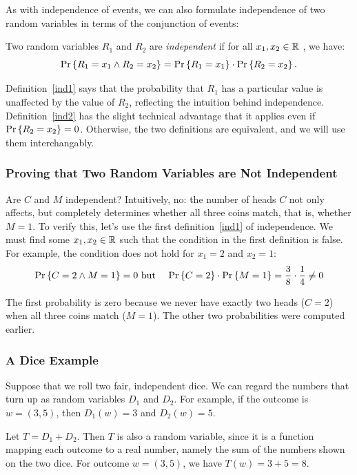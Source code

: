 \documentclass[11pt,twoside]{article}
\begin{document}
As with independence of events, we can also formulate independence of two
random variables in terms of the conjunction of events:
\begin{definition}\label{ind2}
Two random variables $R_1$ and $R_2$ are \emph{independent} if for all
$x_1, x_2 \in \mathbb{R}$ , we have:
\[
\mathop{\textup{Pr}}\nolimits\left\{R_1 = x_1 \land R_2 = x_2\right\} = \mathop{\textup{Pr}}\nolimits\left\{R_1 = x_1\right\} \cdot \mathop{\textup{Pr}}\nolimits\left\{R_2 = x_2\right\}.
\]
\end{definition}

Definition~\ref{ind1} says that the probability that $R_1$ has a
particular value is unaffected by the value of $R_2$, reflecting the
intuition behind independence.  Definition~\ref{ind2} has the slight
technical advantage that it applies even if $\mathop{\textup{Pr}}\nolimits\left\{R_2 = x_2\right\} = 0$.
Otherwise, the two definitions are equivalent, and we will use them
interchangably.

\subsubsection{Proving that Two Random Variables are Not Independent}

Are $C$ and $M$ independent?  Intuitively, no: the number of heads $C$
not only affects, but completely determines whether all three coins match,
that is, whether $M = 1$.  To verify this, let's use the first
definition~\ref{ind1} of independence.  We must find some $x_1, x_2 \in
\mathbb{R}$ such that the condition in the first definition is false.  For
example, the condition does not hold for $x_1 = 2$ and $x_2 = 1$:
\begin{eqnarray*}
\mathop{\textup{Pr}}\nolimits\left\{C = 2 \land M = 1\right\} = 0
        & \mbox{ but } &
\mathop{\textup{Pr}}\nolimits\left\{C = 2\right\} \cdot \mathop{\textup{Pr}}\nolimits\left\{M = 1\right\} = \frac{3}{8} \cdot \frac{1}{4} \neq 0
\end{eqnarray*}

The first probability is zero because we never have exactly two heads ($C
= 2$) when all three coins match ($M = 1$).  The other two probabilities
were computed earlier.

\subsubsection{A Dice Example}

Suppose that we roll two fair, independent dice.  We can regard the
numbers that turn up as random variables $D_1$ and $D_2$.  For
example, if the outcome is $w = (3, 5)$, then $D_1(w) = 3$ and $D_2(w)
= 5$.

Let $T = D_1 + D_2$.  Then $T$ is also a random variable, since it is
a function mapping each outcome to a real number, namely the sum of
the numbers shown on the two dice.  For outcome $w = (3, 5)$, we have
$T(w) = 3 + 5 = 8$.
\end{document}
